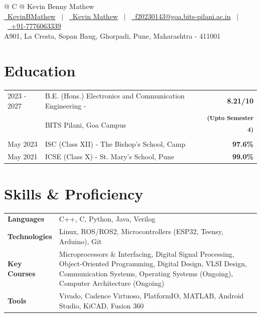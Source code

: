 \documentclass[a4paper,12pt]{article}
\begin{document}
\pagestyle{empty} 
\justifying

\begin{tabularx}{\linewidth}{@{} C @{}}
\Huge{Kevin Benny Mathew} \\[7.5pt]
\href{https://github.com/KevinBMathew}{\raisebox{-0.05\height}\faGithub\ KevinBMathew} \ $|$ \ 
\href{https://linkedin.com/in/kevin-mathew-672774249}{\raisebox{-0.05\height}\faLinkedin\ 
Kevin Mathew} \ $|$ \ 
\href{mailto:f20230143@goa.bits-pilani.ac.in}{\raisebox{-0.05\height}\faEnvelope \ f20230143@goa.bits-pilani.ac.in} \ $|$ \ 
\href{tel:+917776063339}{\raisebox{-0.05\height}\faMobile \ +91-7776063339} \\
\normalsize{A901, La Cresta, Sopan Baug, Ghorpadi, Pune, Maharashtra - 411001}
\end{tabularx}

\section{Education}
\begin{tabularx}{\linewidth}{@{}l X r@{}}	
2023 - 2027 & B.E.
(Hons.) Electronics and Communication Engineering - & \textbf{8.21/10} \\
& BITS Pilani, Goa Campus &  \textsuperscript{\textbf{(Upto Semester 4)}}\\
May 2023 & ISC (Class XII) - The Bishop's School, Camp & \textbf{97.6\%} \\
May 2021 & ICSE (Class X) - St. Mary's School, Pune & \textbf{99.0\%} \\
\end{tabularx}

\section{Skills \& Proficiency}
\begin{tabularx}{\linewidth}{@{}l X@{}}
	\textbf{Languages} & C++, C, Python, Java, Verilog \\
	\textbf{Technologies} & Linux, ROS/ROS2, Microcontrollers (ESP32, Teensy, Arduino), Git \\
	\textbf{Key Courses} & Microprocessors \& Interfacing, Digital Signal Processing, Object-Oriented Programming, Digital Design, VLSI Design, Communication Systems, Operating Systems (Ongoing), Computer Architecture (Ongoing)\\
	\textbf{Tools} & Vivado, Cadence Virtuoso, PlatformIO, MATLAB, Android Studio, KiCAD, Fusion 360\\
\end{tabularx}
\end{document}
